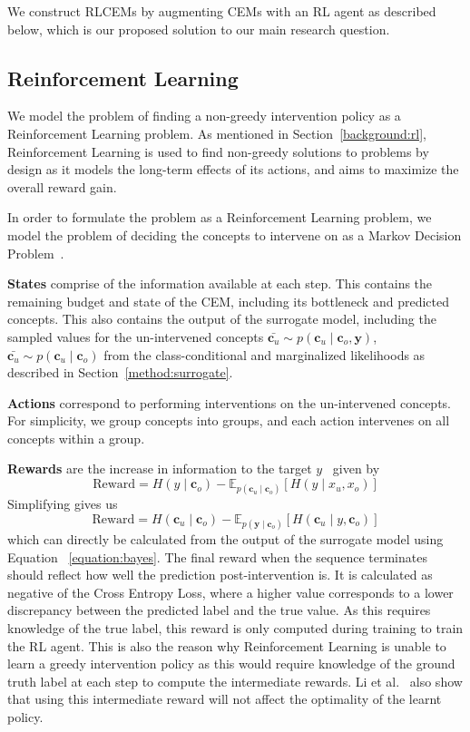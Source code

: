 We construct RLCEMs by augmenting CEMs with an RL agent as 
described below, which is our proposed
solution to our main research question.


\subsection{Reinforcement Learning}\label{method:rl}

We model the problem of finding a non-greedy intervention policy as a 
Reinforcement Learning problem. As mentioned in Section~\ref{background:rl},
Reinforcement Learning is used to find non-greedy solutions to problems
by design as it models the long-term effects of its actions, and aims to 
maximize the overall reward gain. 

In order to formulate the problem
as a Reinforcement Learning problem, we model the problem
of deciding the concepts to intervene on  
as a Markov Decision Problem~\cite{rl-mdp}.

\textbf{States} comprise of the information available
    at each step. This contains the remaining budget and 
    state of the CEM, including its bottleneck and predicted concepts.
    This also contains the output of the surrogate model, 
    including the sampled values for the un-intervened concepts 
    $\bar{\mathbf{c}_u} \sim p(\mathbf{c}_u \mid \mathbf{c}_o, \mathbf{y})$,
    $\bar{\mathbf{c}_u} \sim p(\mathbf{c}_u \mid \mathbf{c}_o)$
    from the class-conditional and marginalized likelihoods
    as described in Section~\ref{method:surrogate}.

\textbf{Actions} correspond to performing interventions 
on the un-intervened concepts.
For simplicity, we group concepts into groups, and each action intervenes on all concepts
within a group.

\textbf{Rewards} are the increase in 
    information to the target $y$~\cite{afa} given by
    \[\text{Reward} = H(y \mid \mathbf{c}_o) - \mathbb{E}_{p(\mathbf{c}_u \mid \mathbf{c}_o)} [H(y \mid x_u, x_o)]\]
    Simplifying gives us
    \[\text{Reward} = H(\mathbf{c}_u \mid \mathbf{c}_o) - 
    \mathbb{E}_{p(\mathbf{y} \mid \mathbf{c}_o)} [H(\mathbf{c}_u \mid y, \mathbf{c}_o)]\]
    which can directly be calculated from the output of the surrogate model using Equation 
    ~\ref{equation:bayes}.
    The final reward when the sequence terminates 
    should reflect how well the prediction post-intervention is.
    It is calculated as negative of the Cross Entropy Loss, where a higher value corresponds to 
    a lower discrepancy between the predicted label and the true value. 
    As this requires knowledge of the true label,
    this reward is only computed during training to train the RL agent. 
    This is also the reason why
    Reinforcement Learning is unable to learn a greedy intervention policy as this would
    require knowledge of the ground truth label at each step to compute the intermediate rewards.
    Li et al.~\cite{afa} 
    also show that using this intermediate reward will not affect the optimality of the learnt policy.
    
